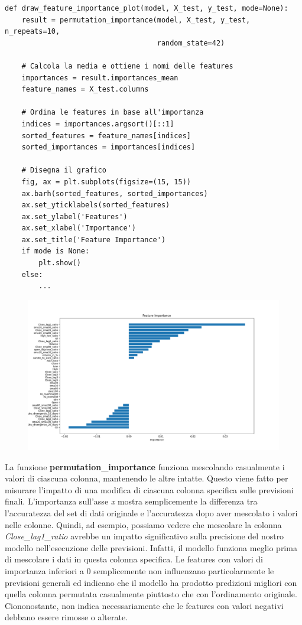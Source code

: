 \documentclass{article}
\begin{document}
\begin{verbatim} 
def draw_feature_importance_plot(model, X_test, y_test, mode=None):
    result = permutation_importance(model, X_test, y_test, n_repeats=10,
                                    random_state=42)

    # Calcola la media e ottiene i nomi delle features
    importances = result.importances_mean
    feature_names = X_test.columns

    # Ordina le features in base all'importanza
    indices = importances.argsort()[::1]
    sorted_features = feature_names[indices]
    sorted_importances = importances[indices]

    # Disegna il grafico
    fig, ax = plt.subplots(figsize=(15, 15))
    ax.barh(sorted_features, sorted_importances)
    ax.set_yticklabels(sorted_features)
    ax.set_ylabel('Features')
    ax.set_xlabel('Importance')
    ax.set_title('Feature Importance')
    if mode is None:
        plt.show()
    else:
        ...
\end{verbatim}
\begin{figure}[H]
\centering
\includegraphics[width=1\linewidth]{FeatureImportance.png}
\end{figure}
La funzione \textbf{permutation\_importance} funziona mescolando casualmente i valori di ciascuna colonna, mantenendo le altre intatte. Questo viene fatto per misurare l'impatto di una modifica di ciascuna colonna specifica sulle previsioni finali. L'importanza sull'asse \textit{x} mostra semplicemente la differenza tra l'accuratezza del set di dati originale e l'accuratezza dopo aver mescolato i valori nelle colonne. Quindi, ad esempio, possiamo vedere che mescolare la colonna \textit{Close\_lag1\_ratio} avrebbe un impatto significativo sulla precisione del nostro modello nell'esecuzione delle previsioni. Infatti, il modello funziona meglio prima di mescolare i dati in questa colonna specifica. Le features con valori di importanza inferiori a 0 semplicemente non influenzano particolarmente le previsioni generali ed indicano che il modello ha prodotto predizioni migliori con quella colonna permutata casualmente piuttosto che con l'ordinamento originale. Ciononostante, non indica necessariamente che le features con valori negativi debbano essere rimosse o alterate. \\ \\
\end{document}
